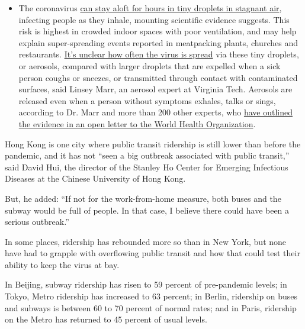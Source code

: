 \begin{itemize}
  \begin{itemize}
  \tightlist
  \item
    The coronavirus
    \href{https://www.nytimes3xbfgragh.onion/2020/07/04/health/239-experts-with-one-big-claim-the-coronavirus-is-airborne.html?action=click\&pgtype=Article\&state=default\&region=MAIN_CONTENT_3\&context=storylines_faq}{can
    stay aloft for hours in tiny droplets in stagnant air}, infecting
    people as they inhale, mounting scientific evidence suggests. This
    risk is highest in crowded indoor spaces with poor ventilation, and
    may help explain super-spreading events reported in meatpacking
    plants, churches and restaurants.
    \href{https://www.nytimes3xbfgragh.onion/2020/07/06/health/coronavirus-airborne-aerosols.html?action=click\&pgtype=Article\&state=default\&region=MAIN_CONTENT_3\&context=storylines_faq}{It's
    unclear how often the virus is spread} via these tiny droplets, or
    aerosols, compared with larger droplets that are expelled when a
    sick person coughs or sneezes, or transmitted through contact with
    contaminated surfaces, said Linsey Marr, an aerosol expert at
    Virginia Tech. Aerosols are released even when a person without
    symptoms exhales, talks or sings, according to Dr. Marr and more
    than 200 other experts, who
    \href{https://academic.oup.com/cid/article/doi/10.1093/cid/ciaa939/5867798}{have
    outlined the evidence in an open letter to the World Health
    Organization}.
  \end{itemize}
\end{itemize}

Hong Kong is one city where public transit ridership is still lower than
before the pandemic, and it has not ``seen a big outbreak associated
with public transit,'' said David Hui, the director of the Stanley Ho
Center for Emerging Infectious Diseases at the Chinese University of
Hong Kong.

But, he added: ``If not for the work-from-home measure, both buses and
the subway would be full of people. In that case, I believe there could
have been a serious outbreak.''

In some places, ridership has rebounded more so than in New York, but
none have had to grapple with overflowing public transit and how that
could test their ability to keep the virus at bay.

In Beijing, subway ridership has risen to 59 percent of pre-pandemic
levels; in Tokyo, Metro ridership has increased to 63 percent; in
Berlin, ridership on buses and subways is between 60 to 70 percent of
normal rates; and in Paris, ridership on the Metro has returned to 45
percent of usual levels.

